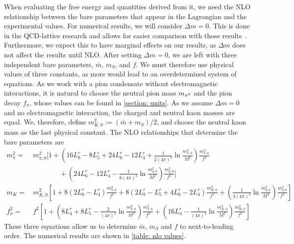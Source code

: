  When evaluating the free energy and quantities derived from it, we need the NLO relationship between the bare parameters that appear in the Lagrangian and the experimental values.
For numerical results, we will consider $\Delta m = 0$.
This is done in the QCD-lattice research and allows for easier comparison with those results~\autocite{brandtNewClassCompact2018}.
Furthermore, we expect this to have marginal effects on our results, as $\Delta m$ does not affect the results until NLO.
After setting $\Delta m = 0$, we are left with three independent bare parameters, $\bar m$, $m_S$, and $f$.
We must therefore use physical values of three constants, as more would lead to an overdetermined system of equations.
As we work with a pion condensate without electromagnetic interactions, it is natural to choose the neutral pion mass $m_{\pi^0}$ and the pion decay $f_\pi$, whose values can be found in \autoref{section: units}.
As we assume $\Delta m = 0$ and no electromagnetic interaction, the charged and neutral kaon masses are equal.
We, therefore, define $m_{K,0}^2 := (\bar m + m_S)/2$, and choose the neutral kaon mass as the last physical constant.
The NLO relationships that determine the bare parameters are~\autocite{gasserChiralPerturbationTheory1985}
%
\begin{align}
    \nonumber
    m_\pi^2 
    =&\, 
    m_{\pi,0}^2
    \Bigg[
        1
        +
        \left(
            16L_8^r - 8L_5^r + 24L_6^r - 12L_4^r
            +
            \frac{1}{2(4\pi)^2}
            \ln\frac{m_{\pi,0}^2}{M^2}
        \right)\frac{m_{\pi,0}^2}{f^2}\\ 
        & \quad \quad \quad \quad
        +
        \left(
            24L_6^r - 12L_4^r
            -
            \frac{1}{6(4\pi)^2}
            \ln\frac{m_{\eta,0}^2}{M^2}
        \right)\frac{m_{\eta,0}^2}{f^2}
    \Bigg] \\
    m_{K}
    =&\,
    m_{K,0}^2
    \left[
        1
        + 8\left(2L_6^r - L_4^r\right) \frac{m_{\pi,0}^2}{f^2}
        + 8\left(2L_8^r - L_5^r + 4L_6^r- 2L_4^r\right) \frac{m_{K,0}^2}{f^2}
        +
        \left(        
            \frac{1}{3(4 \pi)^2} 
            \ln\frac{m_{\eta,0}^2}{M^2}
        \right)
        \frac{m_{\eta,0}^2}{f^2}
    \right]\\
    f_\pi^2
    =&\, f^2
    \left[
        1
        + 
        \left(
            8 L_4^r + 8 L_5^r - \frac{2}{(4\pi)^2} \ln\frac{m_{\pi,0}^2}{M^2}
        \right) \frac{m_{\pi,0}^2}{f^2}
        +
        \left(
            16 L_4^r
            - \frac{1}{(4\pi)^2} \ln\frac {m_{K,0}^2}{M^2}
        \right) \frac{m_{K,0}^2}{f^2}
    \right]
\end{align}
%
These three equations allow us to determine $\bar m$, $m_S$ and $f$ to next-to-leading order.
The numerical results are shown in \autoref{table: nlo values}.

